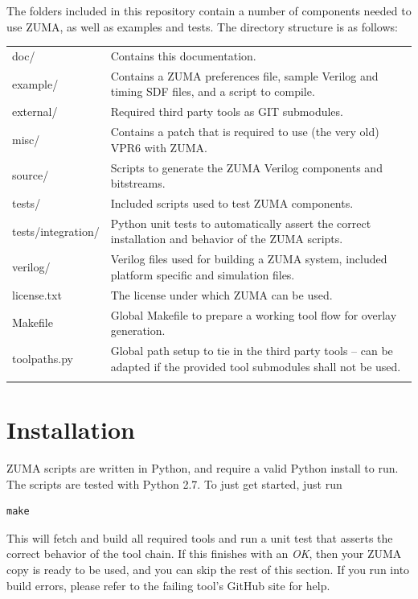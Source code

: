 \documentclass{article}
\begin{document}
\noindent The folders included in this repository contain a number of components needed to use ZUMA, as well as examples and tests.
The directory structure is as follows:\\[1.5mm]
\renewcommand{\arraystretch}{1.4}%
\begin{tabularx}{\textwidth}{lX}
    \hline 
    doc/               &  Contains this documentation.  \\
    example/           &  Contains a ZUMA preferences file, sample Verilog and timing SDF files, and a script to compile.  \\
    external/          &  Required third party tools as GIT submodules. \\
    misc/              &  Contains a patch that is required to use (the very old) VPR6 with ZUMA. \\
    source/            &  Scripts to generate the ZUMA Verilog components and bitstreams. \\
    tests/             &  Included scripts used to test ZUMA components. \\
    tests/integration/ &  Python unit tests to automatically assert the correct installation and behavior of the ZUMA scripts. \\
    verilog/           &  Verilog files used for building a ZUMA system, included platform specific and simulation files. \\
    license.txt        &  The license under which ZUMA can be used. \\
    Makefile           &  Global Makefile to prepare a working tool flow for overlay generation. \\
    toolpaths.py       &  Global path setup to tie in the third party tools -- can be adapted if the provided tool submodules shall not be used. \\
    \hline \\
\end{tabularx}












\section{Installation}
\label{sec:installation}
ZUMA scripts are written in Python, and require a valid Python install to run.
The scripts are tested with Python 2.7. To just get started, just run
\begin{verbatim}
make
\end{verbatim}
This will fetch and build all required tools and run a unit test that asserts the correct behavior of the tool chain. If this finishes with an \emph{OK}, then your ZUMA copy is ready to be used, and you can skip the rest of this section.
If you run into build errors, please refer to the failing tool's GitHub site for help.
\end{document}
